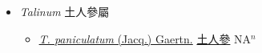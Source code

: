 
  \begin{itemize}
 \item[] \textit{Talinum} 土人參屬
                    
  \begin{itemize}
        \item[] \href{http://www.theplantlist.org/tpl1.1/search?q=Talinum+paniculatum}{\textit{T. paniculatum} (Jacq.) Gaertn.}   \href{\detokenize{http://taibnet.sinica.edu.tw/chi/taibnet_species_list.php?T2=土人參&T2_new_value=true&fr=y}}{土人參} NA$^n$
  \end{itemize}
  \end{itemize}
